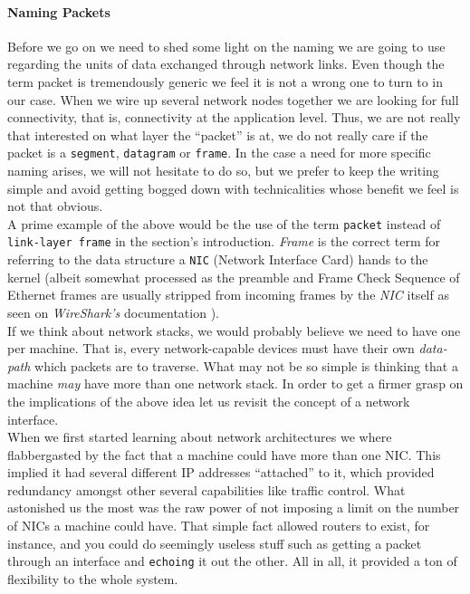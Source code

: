          \paragraph{Naming Packets}
            Before we go on we need to shed some light on the naming we are going to use regarding the units of data exchanged through network links. Even though the term packet is tremendously generic we feel it is not a wrong one to turn to in our case. When we wire up several network nodes together we are looking for full connectivity, that is, connectivity at the application level. Thus, we are not really that interested on what layer the ``packet'' is at, we do not really care if the packet is a \texttt{segment}, \texttt{datagram} or \texttt{frame}. In the case a need for more specific naming arises, we will not hesitate to do so, but we prefer to keep the writing simple and avoid getting bogged down with technicalities whose benefit we feel is not that obvious.\\

            A prime example of the above would be the use of the term \texttt{packet} instead of \texttt{link-layer frame} in the section's introduction. \textit{Frame} is the correct term for referring to the data structure a \texttt{NIC} (Network Interface Card) hands to the kernel (albeit somewhat processed as the preamble and Frame Check Sequence of Ethernet frames are usually stripped from incoming frames by the \textit{NIC} itself as seen on \textit{WireShark's} documentation \cite{bib:wireshark-eth-doc}).\\

        If we think about network stacks, we would probably believe we need to have one per machine. That is, every network-capable devices must have their own \textit{data-path} which packets are to traverse. What may not be so simple is thinking that a machine \textit{may} have more than one network stack. In order to get a firmer grasp on the implications of the above idea let us revisit the concept of a network interface.\\

        When we first started learning about network architectures we where flabbergasted by the fact that a machine could have more than one NIC. This implied it had several different IP addresses ``attached'' to it, which provided redundancy amongst other several capabilities like traffic control. What astonished us the most was the raw power of not imposing a limit on the number of NICs a machine could have. That simple fact allowed routers to exist, for instance, and you could do seemingly useless stuff such as getting a packet through an interface and \texttt{echoing} it out the other. All in all, it provided a ton of flexibility to the whole system.\\

